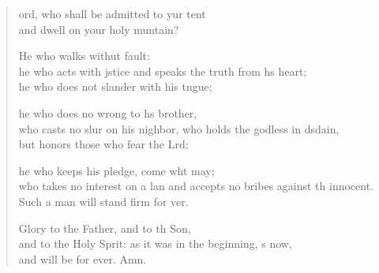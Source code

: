 \settowidth{\versewidth}{and accepts no bribes against the innocent.   *}
\begin{verse}%
  \begin{patverse}
ord, who shall be admitted to yur tent\Med\\
and dwell on your holy muntain?

He who walks withut fault:\Med\\
he who acts with jstice
and speaks the truth from h\pointup{\i}s heart;\Med\\
he who does not slander with his tngue;

he who does no wrong to h\pointup{\i}s brother,\Med\\
who casts no slur on his nighbor,
who holds the godless in d\pointup{\i}sdain,\Med\\
but honors those who fear the Lrd;

he who keeps his pledge, come wht may;\Med\\
who takes no interest on a lan
and accepts no bribes against th innocent.\Med\\
Such a man will stand firm for ver.

Glory to the Father, and to th Son,\Med\\
and to the Holy Sp\pointup{\i}rit:
as it was in the beginning, \pointup{\i}s now,\Med\\
and will be for ever. Amn.
  \end{patverse}
\end{verse}
